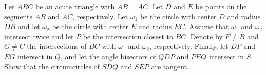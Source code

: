 Let $ABC$ be an acute triangle with $AB=AC$.
Let $D$ and $E$ be points on the segments $AB$ and $AC$, respectively.
Let $\omega_1$ be the circle with center $D$ and radius $DB$ and let $\omega_2$ be the circle
with center $E$ and radius $EC$.
Assume that $\omega_1$ and $\omega_2$ intersect twice and let $P$ be the intersection closest to $BC$.
Denote by $F \neq B$ and $G \neq C$ the intersections of $BC$ with $\omega_1$ and $\omega_2$, respectively.
Finally, let $DF$ and $EG$ intersect in $Q$, and let the angle bisectors of $QDP$ and $PEQ$ intersect in $S$.
Show that the circumcircles of $SDQ$ and $SEP$ are tangent.
